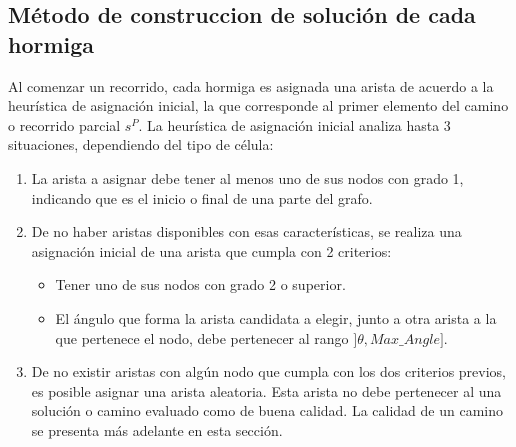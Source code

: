 \subsection{M\'etodo de construccion de soluci\'on de cada hormiga}
\label{subsubsec:antTourInit}
Al comenzar un recorrido, cada hormiga es asignada una arista de acuerdo a la heur\'istica de asignaci\'on inicial, la que corresponde al primer elemento del camino o recorrido parcial $s^{P}$. La heur\'istica de asignaci\'on inicial analiza hasta 3 situaciones, dependiendo del tipo de c\'elula:
\begin{enumerate}
\item La arista a asignar debe tener al menos uno de sus nodos con grado 1, indicando que es el inicio o final de una parte del grafo.

\item De no haber aristas disponibles con esas caracter\'isticas, se realiza una asignaci\'on inicial de una arista que cumpla con 2 criterios:
\begin{itemize}
    \item Tener uno de sus nodos con grado 2 o superior.
    \item El \'angulo que forma la arista candidata a elegir, junto a otra arista a la que pertenece el nodo, debe pertenecer al rango $]\theta, Max\_Angle]$.
\end{itemize}

\item De no existir aristas con alg\'un nodo que cumpla con los dos criterios previos, es posible asignar una arista aleatoria. Esta arista no debe pertenecer al una soluci\'on o camino evaluado como de buena calidad. La calidad de un camino se presenta m\'as adelante en esta secci\'on.
\end{enumerate}


